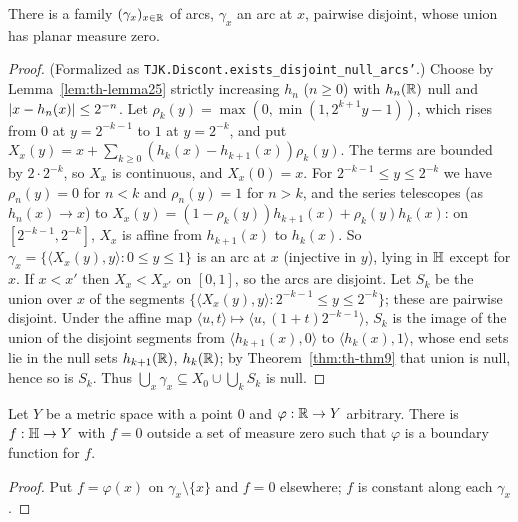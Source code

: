 \begin{theorem}\label{thm:th-thm10}
There is a family $(\gamma_x)_{x\in\mathbb{R}}$ of arcs, $\gamma_x$ an arc at $x$, pairwise disjoint, whose union has planar measure zero.
\end{theorem}
\begin{proof}
(Formalized as \texttt{TJK.Discont.exists\_disjoint\_null\_arcs'}.)
Choose by Lemma~\ref{lem:th-lemma25} strictly increasing $h_n$ ($n\ge0$) with $h_n(\mathbb{R})$ null and $\lvert x-h_n(x)\rvert\le2^{-n}$. Let
$\rho_k(y)=\max(0,\min(1,2^{k+1}y-1))$, which rises from $0$ at $y=2^{-k-1}$ to $1$ at $y=2^{-k}$, and put
$X_x(y)=x+\sum_{k\ge0}(h_k(x)-h_{k+1}(x))\rho_k(y)$. The terms are bounded by $2\cdot2^{-k}$, so $X_x$ is continuous, and $X_x(0)=x$.
For $2^{-k-1}\le y\le2^{-k}$ we have $\rho_n(y)=0$ for $n<k$ and $\rho_n(y)=1$ for $n>k$, and the series telescopes (as
$h_n(x)\to x$) to $X_x(y)=(1-\rho_k(y))h_{k+1}(x)+\rho_k(y)h_k(x)$: on $[2^{-k-1},2^{-k}]$, $X_x$ is affine from $h_{k+1}(x)$ to $h_k(x)$.
So $\gamma_x=\{\langle X_x(y),y\rangle:0\le y\le1\}$ is an arc at $x$ (injective in $y$), lying in $\mathbb{H}$ except for $x$.
If $x<x'$ then $X_x<X_{x'}$ on $[0,1]$, so the arcs are disjoint. Let $S_k$ be the union over $x$ of the segments
$\{\langle X_x(y),y\rangle:2^{-k-1}\le y\le2^{-k}\}$; these are pairwise disjoint. Under the affine map
$\langle u,t\rangle\mapsto\langle u,(1+t)2^{-k-1}\rangle$, $S_k$ is the image of the union of the disjoint segments from
$\langle h_{k+1}(x),0\rangle$ to $\langle h_k(x),1\rangle$, whose end sets lie in the null sets $h_{k+1}(\mathbb{R})$, $h_k(\mathbb{R})$; by
Theorem~\ref{thm:th-thm9} that union is null, hence so is $S_k$. Thus $\bigcup_x\gamma_x\subseteq X_0\cup\bigcup_kS_k$ is null.
\end{proof}

\begin{corollary}\label{cor:ae-zero}
Let $Y$ be a metric space with a point $0$ and $\varphi:\mathbb{R}\to Y$ arbitrary. There is $f:\mathbb{H}\to Y$ with $f=0$ outside a set of
measure zero such that $\varphi$ is a boundary function for $f$.
\end{corollary}
\begin{proof}
Put $f=\varphi(x)$ on $\gamma_x\setminus\{x\}$ and $f=0$ elsewhere; $f$ is constant along each $\gamma_x$.
\end{proof}


